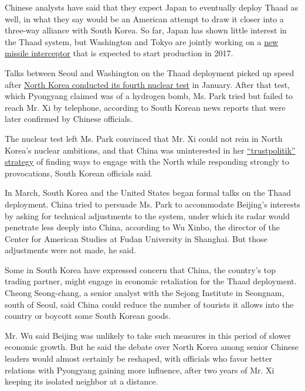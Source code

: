 Chinese analysts have said that they expect Japan to eventually deploy
Thaad as well, in what they say would be an American attempt to draw it
closer into a three-way alliance with South Korea. So far, Japan has
shown little interest in the Thaad system, but Washington and Tokyo are
jointly working on a
\href{http://spacenews.com/new-sm-3-variant-faces-two-intercept-tests-this-year/}{new
missile interceptor} that is expected to start production in 2017.

Talks between Seoul and Washington on the Thaad deployment picked up
speed after
\href{http://www.nytimes3xbfgragh.onion/2016/01/07/world/asia/north-korea-hydrogen-bomb-q-a.html}{North
Korea conducted its fourth nuclear test} in January. After that test,
which Pyongyang claimed was of a hydrogen bomb, Ms. Park tried but
failed to reach Mr. Xi by telephone, according to South Korean news
reports that were later confirmed by Chinese officials.

The nuclear test left Ms. Park convinced that Mr. Xi could not rein in
North Korea's nuclear ambitions, and that China was uninterested in her
\href{http://www.nytimes3xbfgragh.onion/2013/05/08/world/asia/obama-backs-policy-of-south-koreas-president-on-north.html}{``trustpolitik''
strategy} of finding ways to engage with the North while responding
strongly to provocations, South Korean officials said.

In March, South Korea and the United States began formal talks on the
Thaad deployment. China tried to persuade Ms. Park to accommodate
Beijing's interests by asking for technical adjustments to the system,
under which its radar would penetrate less deeply into China, according
to Wu Xinbo, the director of the Center for American Studies at Fudan
University in Shanghai. But those adjustments were not made, he said.

Some in South Korea have expressed concern that China, the country's top
trading partner, might engage in economic retaliation for the Thaad
deployment. Cheong Seong-chang, a senior analyst with the Sejong
Institute in Seongnam, south of Seoul, said China could reduce the
number of tourists it allows into the country or boycott some South
Korean goods.

Mr. Wu said Beijing was unlikely to take such measures in this period of
slower economic growth. But he said the debate over North Korea among
senior Chinese leaders would almost certainly be reshaped, with
officials who favor better relations with Pyongyang gaining more
influence, after two years of Mr. Xi keeping its isolated neighbor at a
distance.


